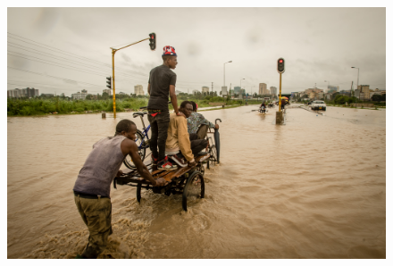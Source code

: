 \documentclass[a4paper,12pt,twoside]{article}
\begin{document}
\begin{figure}[h!]
	\centering
	\includegraphics[width=\textwidth, height=12cm]{images/Flooding_Jangwani_April_2018_Chris_Morgan.JPG}
\end{figure}
	
\end{document}
